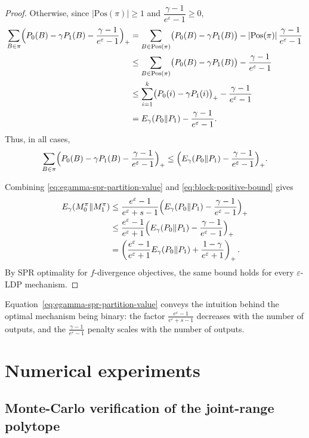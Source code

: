\documentclass{article}
\theoremstyle{plain}
\theoremstyle{definition}
\theoremstyle{plain}
\newcommand{\eps}{\varepsilon}
\begin{document}
\begin{proof}
Otherwise, since $|\mathrm{Pos}(\pi)|\ge 1$ and $\dfrac{\gamma-1}{e^\eps-1}\ge 0$,
\begin{align*}
    \sum_{B\in\pi} \Bigl(P_0(B)-\gamma P_1(B)-\dfrac{\gamma-1}{e^\eps-1}\Bigr)_+
    &=
    \sum_{B\in\mathrm{Pos}(\pi)} \bigl(P_0(B)-\gamma P_1(B)\bigr) - |\mathrm{Pos}(\pi)|\,\dfrac{\gamma-1}{e^\eps-1} \\
    &\le
    \sum_{B\in\mathrm{Pos}(\pi)} \bigl(P_0(B)-\gamma P_1(B)\bigr) - \dfrac{\gamma-1}{e^\eps-1} \\
    &\le
    \sum_{i=1}^k \bigl(P_0(i)-\gamma P_1(i)\bigr)_+ - \dfrac{\gamma-1}{e^\eps-1} \\
    &=
    E_\gamma(P_0\|P_1) - \dfrac{\gamma-1}{e^\eps-1} .
\end{align*}
Thus, in all cases,
\begin{align}
    \label{eq:block-positive-bound}
    \sum_{B\in\pi} \Bigl(P_0(B)-\gamma P_1(B)-\dfrac{\gamma-1}{e^\eps-1}\Bigr)_+
    \le
    \Bigl(E_\gamma(P_0\|P_1)-\dfrac{\gamma-1}{e^\eps-1}\Bigr)_+ .
\end{align}

Combining \eqref{eq:egamma-spr-partition-value} and \eqref{eq:block-positive-bound} gives
\begin{align*}
    E_\gamma(M_0^\pi\|M_1^\pi)
    &\le
    \frac{e^\eps-1}{e^\eps+s-1}\Bigl(E_\gamma(P_0\|P_1)-\dfrac{\gamma-1}{e^\eps-1}\Bigr)_+ \\
    &\le
    \frac{e^\eps-1}{e^\eps+1}\Bigl(E_\gamma(P_0\|P_1)-\dfrac{\gamma-1}{e^\eps-1}\Bigr)_+ \\
    &=
    \left(
        \frac{e^\eps-1}{e^\eps+1}E_\gamma(P_0\|P_1)
        + \frac{1-\gamma}{e^\eps+1}
    \right)_+ .
\end{align*}
By SPR optimality for $f$-divergence objectives, the same bound holds for every $\eps$-LDP mechanism.
\end{proof}

Equation~\eqref{eq:egamma-spr-partition-value} conveys the intuition behind the optimal mechanism being binary: the factor $\frac{e^\eps-1}{e^\eps+s-1}$ decreases with the number of outputs, and the $\frac{\gamma-1}{e^\eps-1}$ penalty scales with the number of outputs.

\section{Numerical experiments}
\label{sec:experiments}

\subsection{Monte-Carlo verification of the joint-range polytope}
\label{sec:joint-range-monte-carlo}
\end{document}
